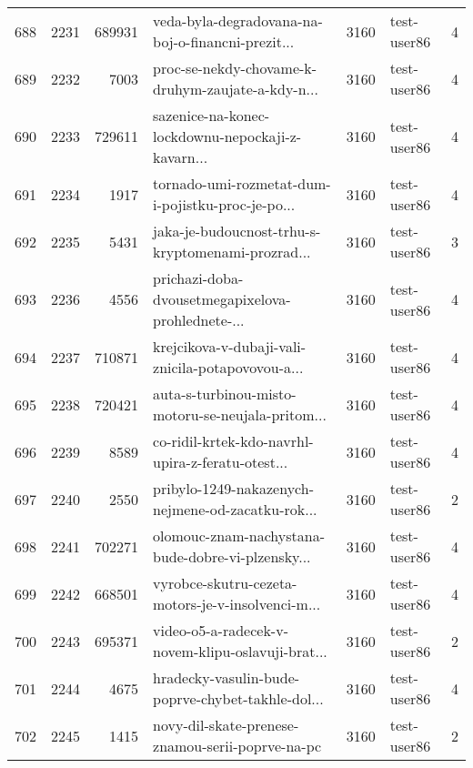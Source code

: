 \begin{tabular}{lrrlrlr}
688  &       2231 &   689931 &  veda-byla-degradovana-na-boj-o-financni-prezit... &     3160 &                  test-user86 &               4 \\
689  &       2232 &     7003 &  proc-se-nekdy-chovame-k-druhym-zaujate-a-kdy-n... &     3160 &                  test-user86 &               4 \\
690  &       2233 &   729611 &  sazenice-na-konec-lockdownu-nepockaji-z-kavarn... &     3160 &                  test-user86 &               4 \\
691  &       2234 &     1917 &  tornado-umi-rozmetat-dum-i-pojistku-proc-je-po... &     3160 &                  test-user86 &               4 \\
692  &       2235 &     5431 &  jaka-je-budoucnost-trhu-s-kryptomenami-prozrad... &     3160 &                  test-user86 &               3 \\
693  &       2236 &     4556 &  prichazi-doba-dvousetmegapixelova-prohlednete-... &     3160 &                  test-user86 &               4 \\
694  &       2237 &   710871 &  krejcikova-v-dubaji-vali-znicila-potapovovou-a... &     3160 &                  test-user86 &               4 \\
695  &       2238 &   720421 &  auta-s-turbinou-misto-motoru-se-neujala-pritom... &     3160 &                  test-user86 &               4 \\
696  &       2239 &     8589 &  co-ridil-krtek-kdo-navrhl-upira-z-feratu-otest... &     3160 &                  test-user86 &               4 \\
697  &       2240 &     2550 &  pribylo-1249-nakazenych-nejmene-od-zacatku-rok... &     3160 &                  test-user86 &               2 \\
698  &       2241 &   702271 &  olomouc-znam-nachystana-bude-dobre-vi-plzensky... &     3160 &                  test-user86 &               4 \\
699  &       2242 &   668501 &  vyrobce-skutru-cezeta-motors-je-v-insolvenci-m... &     3160 &                  test-user86 &               4 \\
700  &       2243 &   695371 &  video-o5-a-radecek-v-novem-klipu-oslavuji-brat... &     3160 &                  test-user86 &               2 \\
701  &       2244 &     4675 &  hradecky-vasulin-bude-poprve-chybet-takhle-dol... &     3160 &                  test-user86 &               4 \\
702  &       2245 &     1415 &   novy-dil-skate-prenese-znamou-serii-poprve-na-pc &     3160 &                  test-user86 &               2 \\

\end{tabular}
